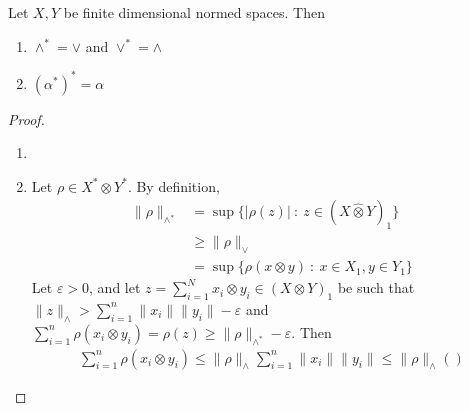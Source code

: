 \begin{exercise}
  Let $X, Y$ be finite dimensional normed spaces. Then
  \begin{enumerate}[label=(\arabic*)]
    \item $\wedge^* = \vee$ and $\vee^* = \wedge$
    \item $(\alpha^*)^* = \alpha$
  \end{enumerate}
\end{exercise}
\begin{proof}
  \begin{enumerate}[label=(\arabic*)]
    \item
    \item
      Let $\rho \in X^* \otimes Y^*$. By definition,
      \begin{align*}
        \|\rho\|_{\wedge^*} &= \sup \{ |\rho(z)| \ : \ z \in (X
        \hat{\otimes} Y)_1 \} \\
        &\ge \|\rho\|_{\vee} \\
        &= \sup \{ \rho(x \otimes y) \ : \ x \in X_1, y \in Y_1 \}
      \end{align*}
      Let $\varepsilon >0$, and let $z = \sum_{i = 1}^{N} x_i \otimes
      y_i \in (X \otimes Y)_1$
      be such that $\|z\|_{\wedge} > \sum_{i = 1}^{n} \|x_i\|\|y_i\|
      - \varepsilon$ and $\sum_{i = 1}^{n}  \rho(x_i \otimes y_i) = \rho(z)
      \ge \|\rho\|_{\wedge^*} - \varepsilon$. Then
      \begin{align*}
        \sum_{i = 1}^{n}  \rho(x_i \otimes y_i) \le \|\rho\|_{\wedge}
        \sum_{i = 1}^{n} \|x_i\|\|y_i\| \le \|\rho\|_{\wedge}()
      \end{align*}
  \end{enumerate}
\end{proof}
